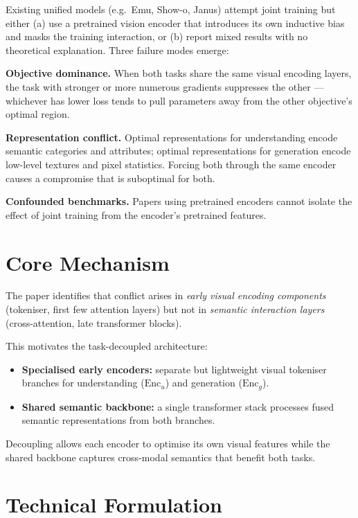 \documentclass[10pt,twocolumn]{article}
\begin{document}
Existing unified models (e.g.\ Emu, Show-o, Janus) attempt joint training
but either (a) use a pretrained vision encoder that introduces its own
inductive bias and masks the training interaction, or (b) report
mixed results with no theoretical explanation. Three failure modes emerge:

\textbf{Objective dominance.} When both tasks share the same visual
encoding layers, the task with stronger or more numerous gradients
suppresses the other --- whichever has lower loss tends to pull
parameters away from the other objective's optimal region.

\textbf{Representation conflict.} Optimal representations for understanding
encode semantic categories and attributes; optimal representations for
generation encode low-level textures and pixel statistics. Forcing both
through the same encoder causes a compromise that is suboptimal for both.

\textbf{Confounded benchmarks.} Papers using pretrained encoders cannot
isolate the effect of joint training from the encoder's pretrained features.

\section{Core Mechanism}

The paper identifies that conflict arises in \emph{early visual encoding
components} (tokeniser, first few attention layers) but not in \emph{semantic
interaction layers} (cross-attention, late transformer blocks).

This motivates the task-decoupled architecture:
\begin{itemize}[itemsep=2pt,parsep=0pt]
  \item \textbf{Specialised early encoders:} separate but lightweight
    visual tokeniser branches for understanding ($\mathrm{Enc}_u$) and
    generation ($\mathrm{Enc}_g$).
  \item \textbf{Shared semantic backbone:} a single transformer stack
    processes fused semantic representations from both branches.
\end{itemize}

Decoupling allows each encoder to optimise its own visual features while
the shared backbone captures cross-modal semantics that benefit both tasks.

\section{Technical Formulation}
\end{document}
